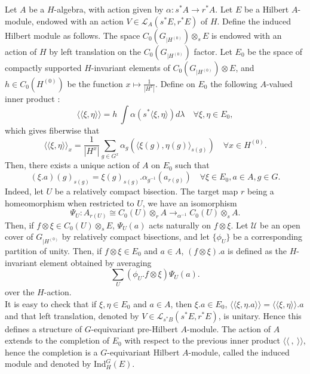 Let $A$ be a $H$-algebra, with action given by $\alpha : s^*A \rightarrow r^* A$. Let $E$ be a Hilbert $A$-module, endowed with an action $V\in\mathcal L_A(s^*E,r^*E)$ of $H$. Define the induced Hilbert module as follows. The space $C_0(G_{|H^{(0)}} )\otimes_s E$ is endowed with an action of $H$ by left translation on the $C_0(G_{|H^{(0)}})$ factor.  Let $E_0$ be the space of compactly supported $H$-invariant elements of $C_0(G_{|H^{(0)}})\otimes E$, and $h\in C_0(H^{(0)})$ be the function $x\mapsto \frac{1}{|H^x|}$. Define on $E_0$ the following $A$-valued inner product :
\[\langle\langle \xi, \eta\rangle\rangle = h\ \int \alpha(s^*\langle \xi,\eta\rangle)d\lambda \quad \forall \xi,\eta\in E_0, \]
which gives fiberwise that 
\[\langle\langle \xi, \eta\rangle\rangle_x = \frac{1}{|H^x|}\sum_{g\in G^x} \alpha_g(\langle \xi (g),\eta (g)\rangle_{s(g)})\quad \forall x\in H^{(0)}.\]
Then, there exists a unique action of $A$ on $E_0$ such that 
\[(\xi .a)(g)_{s(g)} = \xi (g)_{s(g)}.\alpha_{g^{-1}}(a_{r(g)}) \quad \forall \xi \in E_0, a\in A,g\in G.\]
Indeed, let $U$ be a relatively compact bisection. The target map $r$ being a homeomorphism when restricted to $U$, we have an isomorphism 
\[\Psi_U : A_{r(U)}\cong C_0(U)\otimes_r A\rightarrow_{\alpha^{-1}} C_0(U)\otimes_s A.\] 
Then, if $f\otimes \xi \in C_0(U)\otimes_s E $, $\Psi_U(a)$ acts naturally on $f\otimes \xi $. Let $\mathcal U$ be an open cover of $G_{|H^ {(0)}}$ by relatively compact bisections, and let $\{\phi_U\}$ be a corresponding partition of unity. Then, if $f\otimes \xi \in E_0$ and $a\in A$, $(f\otimes \xi ) . a $ is defined as the $H$-invariant element obtained by averaging 
\[\sum_U (\phi_U.f\otimes \xi) \Psi_U(a) .  \]
over the $H$-action.\\

It is easy to check that if $\xi,\eta\in E_0$ and $a\in A$, then $\xi.a\in E_0$, $\langle\langle \xi,\eta.a \rangle\rangle= \langle\langle \xi,\eta \rangle\rangle . a$ and that left translation, denoted by $V\in\mathcal L_{s^* B}(s^* E, r^* E)$, is unitary. Hence this defines a structure of $G$-equivariant pre-Hilbert $A$-module. The action of $A$ extends to the completion of $E_0$ with respect to the previous inner product $\langle\langle \ , \ \rangle\rangle$, hence the completion is a $G$-equivariant Hilbert $A$-module, called the induced module and denoted by $\text{Ind}_H^G (E)$.\\  

